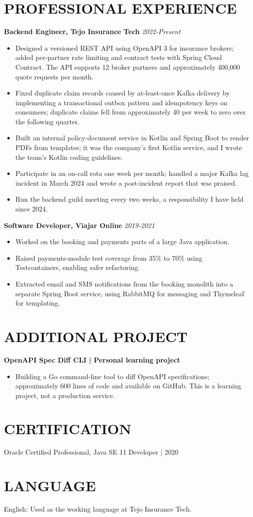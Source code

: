 \documentclass[11pt,a4paper]{article}
\begin{document}
\section*{PROFESSIONAL EXPERIENCE}
\textbf{Backend Engineer, Tejo Insurance Tech} \hfill \textit{2022-Present}
\begin{itemize}
\item Designed a versioned REST API using OpenAPI 3 for insurance brokers; added per-partner rate limiting and contract tests with Spring Cloud Contract. The API supports 12 broker partners and approximately 400,000 quote requests per month.
\item Fixed duplicate claim records caused by at-least-once Kafka delivery by implementing a transactional outbox pattern and idempotency keys on consumers; duplicate claims fell from approximately 40 per week to zero over the following quarter.
\item Built an internal policy-document service in Kotlin and Spring Boot to render PDFs from templates; it was the company's first Kotlin service, and I wrote the team's Kotlin coding guidelines.
\item Participate in an on-call rota one week per month; handled a major Kafka lag incident in March 2024 and wrote a post-incident report that was praised.
\item Run the backend guild meeting every two weeks, a responsibility I have held since 2024.
\end{itemize}

\textbf{Software Developer, Viajar Online} \hfill \textit{2019-2021}
\begin{itemize}
\item Worked on the booking and payments parts of a large Java application.
\item Raised payments-module test coverage from 35\% to 70\% using Testcontainers, enabling safer refactoring.
\item Extracted email and SMS notifications from the booking monolith into a separate Spring Boot service, using RabbitMQ for messaging and Thymeleaf for templating.
\end{itemize}

\section*{ADDITIONAL PROJECT}
\textbf{OpenAPI Spec Diff CLI | Personal learning project}
\begin{itemize}
\item Building a Go command-line tool to diff OpenAPI specifications; approximately 600 lines of code and available on GitHub. This is a learning project, not a production service.
\end{itemize}

\section*{CERTIFICATION}
Oracle Certified Professional, Java SE 11 Developer | 2020

\section*{LANGUAGE}
English: Used as the working language at Tejo Insurance Tech.
\end{document}
